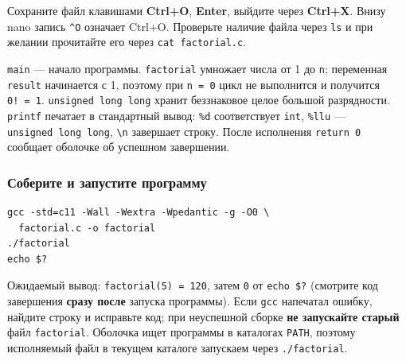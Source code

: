 Сохраните файл клавишами \textbf{Ctrl+O}, \textbf{Enter}, выйдите через
\textbf{Ctrl+X}. Внизу nano запись \texttt{\^{}O} означает Ctrl+O.
Проверьте наличие файла через \texttt{ls} и при желании прочитайте его
через \texttt{cat\ factorial.c}.

\texttt{main} --- начало программы. \texttt{factorial} умножает числа от
1 до \texttt{n}; переменная \texttt{result} начинается с 1, поэтому при
\texttt{n\ =\ 0} цикл не выполнится и получится \texttt{0!\ =\ 1}.
\texttt{unsigned\ long\ long} хранит беззнаковое целое большой
разрядности. \texttt{printf} печатает в стандартный вывод: \texttt{\%d}
соответствует \texttt{int}, \texttt{\%llu} ---
\texttt{unsigned\ long\ long}, \texttt{\textbackslash{}n} завершает
строку. После исполнения \texttt{return\ 0} сообщает оболочке об
успешном завершении.

\hypertarget{ux441ux43eux431ux435ux440ux438ux442ux435-ux438-ux437ux430ux43fux443ux441ux442ux438ux442ux435-ux43fux440ux43eux433ux440ux430ux43cux43cux443}{%
\subsubsection{Соберите и запустите
программу}\label{ux441ux43eux431ux435ux440ux438ux442ux435-ux438-ux437ux430ux43fux443ux441ux442ux438ux442ux435-ux43fux440ux43eux433ux440ux430ux43cux43cux443}}

\begin{verbatim}
gcc -std=c11 -Wall -Wextra -Wpedantic -g -O0 \
  factorial.c -o factorial
./factorial
echo $?
\end{verbatim}

Ожидаемый вывод: \texttt{factorial(5)\ =\ 120}, затем \texttt{0} от
\texttt{echo\ \$?} (смотрите код завершения \textbf{сразу после} запуска
программы). Если \texttt{gcc} напечатал ошибку, найдите строку и
исправьте код; при неуспешной сборке \textbf{не запускайте старый} файл
\texttt{factorial}. Оболочка ищет программы в каталогах \texttt{PATH},
поэтому исполняемый файл в текущем каталоге запускаем через
\texttt{./factorial}.

